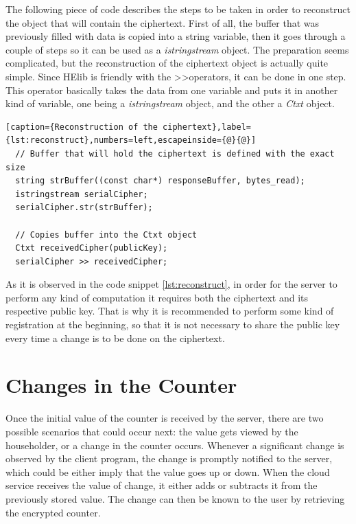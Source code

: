 The following piece of code describes the steps to be taken in order to reconstruct the object that will contain the ciphertext. First of all, the buffer that was previously filled with data is copied into a string variable, then it goes through a couple of steps so it can be used as a \textit{istringstream} object. The preparation seems complicated, but the reconstruction of the ciphertext object is actually quite simple. Since HElib is friendly with the \textgreater\textgreater operators, it can be done in one step. This operator basically takes the data from one variable and puts it in another kind of variable, one being a \textit{istringstream} object, and the other a \textit{Ctxt} object.

\begin{lstlisting}[caption={Reconstruction of the ciphertext},label={lst:reconstruct},numbers=left,escapeinside={@}{@}]
  // Buffer that will hold the ciphertext is defined with the exact size
  string strBuffer((const char*) responseBuffer, bytes_read);
  istringstream serialCipher;
  serialCipher.str(strBuffer);

  // Copies buffer into the Ctxt object
  Ctxt receivedCipher(publicKey);
  serialCipher >> receivedCipher;
\end{lstlisting}

As it is observed in the code snippet \ref{lst:reconstruct}, in order for the server to perform any kind of computation it requires both the ciphertext and its respective public key. That is why it is recommended to perform some kind of registration at the beginning, so that it is not necessary to share the public key every time a change is to be done on the ciphertext. 

\section{{Changes in the Counter}}

Once the initial value of the counter is received by the server, there are two possible scenarios that could occur next: the value gets viewed by the householder, or a change in the counter occurs. Whenever a significant change is observed by the client program, the change is promptly notified to the server, which could be either imply that the value goes up or down. When the cloud service receives the value of change, it either adds or subtracts it from the previously stored value. The change can then be known to the user by retrieving the encrypted counter.

